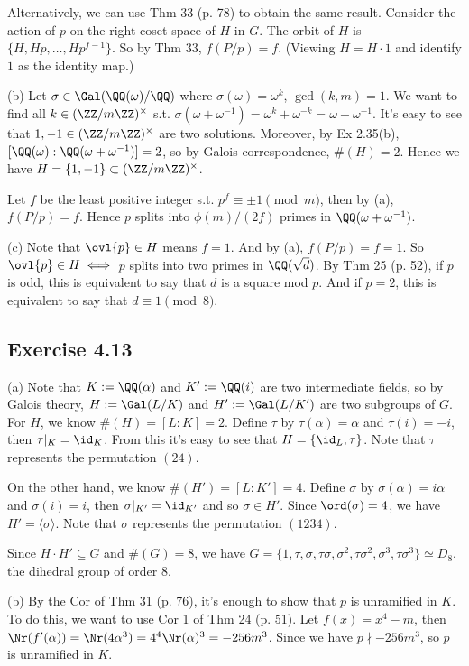 \documentclass[../Chapter.tex]{subfiles}
\begin{document}
Alternatively, we can use Thm 33 (p. 78) to obtain the same result. Consider the action of $p$ on the right coset space of $H$ in $G$. The orbit of $H$ is $\{H,Hp,\ldots,Hp^{f-1}\}$. So by Thm 33, $f(P/p)=f$. (Viewing $H=H\cdot 1$ and identify $1$ as the identity map.)

(b) Let $\sigma\in\Gal(\QQ(\omega)/\QQ)$ where $\sigma(\omega)=\omega^k$, $\gcd(k,m)=1$. We want to find all $k\in(\ZZ/m\ZZ)^\times$ s.t. $\sigma(\omega+\omega^{-1})=\omega^k+\omega^{-k}=\omega+\omega^{-1}$. It's easy to see that $1,-1\in(\ZZ/m\ZZ)^\times$ are two solutions. Moreover, by Ex 2.35(b), $[\QQ(\omega):\QQ(\omega+\omega^{-1})]=2$, so by Galois correspondence, $\#(H)=2$. Hence we have $H=\{1,-1\}\subset(\ZZ/m\ZZ)^\times$.

Let $f$ be the least positive integer s.t. $p^f \equiv \pm1\pmod{m}$, then by (a), $f(P/p)=f$. Hence $p$ splits into $\phi(m)/(2f)$ primes in $\QQ(\omega+\omega^{-1})$.

(c) Note that $\ovl{p}\in H$ means $f=1$. And by (a), $f(P/p)=f=1$. So $\ovl{p}\in H \iff$ $p$ splits into two primes in $\QQ(\sqrt{d})$. By Thm 25 (p. 52), if $p$ is odd, this is equivalent to say that $d$ is a square mod $p$. And if $p=2$, this is equivalent to say that $d\equiv 1\pmod{8}$.

\subsection*{Exercise 4.13}

(a) Note that $K:=\QQ(\alpha)$ and $K':=\QQ(i)$ are two intermediate fields, so by Galois theory, $H:=\Gal(L/K)$ and $H':=\Gal(L/K')$ are two subgroups of $G$.
For $H$, we know $\#(H)=[L:K]=2$. Define $\tau$ by $\tau(\alpha)=\alpha$ and $\tau(i)=-i$, then $\tau|_K=\id_K$. From this it's easy to see that $H=\{\id_L,\tau\}$. Note that $\tau$ represents the permutation $(24)$.

On the other hand, we know $\#(H')=[L:K']=4$. Define $\sigma$ by $\sigma(\alpha)=i\alpha$ and $\sigma(i)=i$, then $\sigma|_{K'}=\id_{K'}$ and so $\sigma\in H'$. Since $\ord(\sigma)=4$, we have $H'=\langle\sigma\rangle$. Note that $\sigma$ represents the permutation $(1234)$.

Since $H\cdot H'\subseteq G$ and $\#(G)=8$, we have $G=\{1,\tau,\sigma,\tau\sigma,\sigma^2,\tau\sigma^2,\sigma^3,\tau\sigma^3\}\simeq D_8$, the dihedral group of order $8$.

(b) By the Cor of Thm 31 (p. 76), it's enough to show that $p$ is unramified in $K$. To do this, we want to use Cor 1 of Thm 24 (p. 51). Let $f(x)=x^4-m$, then $\Nr(f'(\alpha))=\Nr(4\alpha^3)=4^4\Nr(\alpha)^3=-256m^3$. Since we have $p\nmid -256m^3$, so $p$ is unramified in $K$. 
\end{document}

